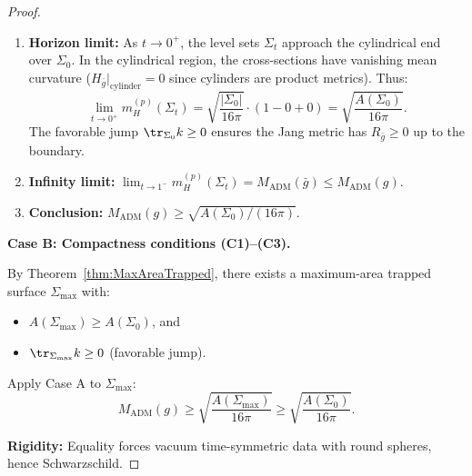 \begin{proof}
\begin{enumerate}
\item \textbf{Horizon limit:} As $t \to 0^+$, the level sets $\Sigma_t$ approach the cylindrical end over $\Sigma_0$. In the cylindrical region, the cross-sections have vanishing mean curvature ($H_{\bar{g}}|_{\text{cylinder}} = 0$ since cylinders are product metrics). Thus:
\begin{equation}
\lim_{t \to 0^+} m_H^{(p)}(\Sigma_t) = \sqrt{\frac{|\Sigma_0|}{16\pi}} \cdot \left(1 - 0 + 0\right) = \sqrt{\frac{A(\Sigma_0)}{16\pi}}.
\end{equation}
The favorable jump $\tr_{\Sigma_0} k \geq 0$ ensures the Jang metric has $R_{\bar{g}} \geq 0$ up to the boundary.

\item \textbf{Infinity limit:} $\lim_{t \to 1^-} m_H^{(p)}(\Sigma_t) = M_{\mathrm{ADM}}(\bar{g}) \leq M_{\mathrm{ADM}}(g)$.

\item \textbf{Conclusion:} $M_{\mathrm{ADM}}(g) \geq \sqrt{A(\Sigma_0)/(16\pi)}$.
\end{enumerate}

\textbf{Case B: Compactness conditions (C1)--(C3).}

By Theorem~\ref{thm:MaxAreaTrapped}, there exists a maximum-area trapped surface $\Sigma_{\max}$ with:
\begin{itemize}
\item $A(\Sigma_{\max}) \geq A(\Sigma_0)$, and
\item $\tr_{\Sigma_{\max}} k \geq 0$ (favorable jump).
\end{itemize}
Apply Case A to $\Sigma_{\max}$:
\begin{equation}
M_{\mathrm{ADM}}(g) \geq \sqrt{\frac{A(\Sigma_{\max})}{16\pi}} \geq \sqrt{\frac{A(\Sigma_0)}{16\pi}}.
\end{equation}

\textbf{Rigidity:} Equality forces vacuum time-symmetric data with round spheres, hence Schwarzschild.
\end{proof}

